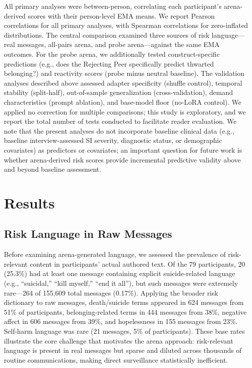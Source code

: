 \documentclass[review,12pt,authoryear]{elsarticle}
\begin{document}
All primary analyses were between-person, correlating each participant's arena-derived scores with their person-level EMA means. We report Pearson correlations for all primary analyses, with Spearman correlations for zero-inflated distributions. The central comparison examined three sources of risk language---real messages, all-pairs arena, and probe arena---against the same EMA outcomes. For the probe arena, we additionally tested construct-specific predictions (e.g., does the Rejecting Peer specifically predict thwarted belonging?) and reactivity scores (probe minus neutral baseline). The validation analyses described above assessed adapter specificity (shuffle control), temporal stability (split-half), out-of-sample generalization (cross-validation), demand characteristics (prompt ablation), and base-model floor (no-LoRA control). We applied no correction for multiple comparisons; this study is exploratory, and we report the total number of tests conducted to facilitate reader evaluation. We note that the present analyses do not incorporate baseline clinical data (e.g., baseline interview-assessed SI severity, diagnostic status, or demographic covariates) as predictors or covariates; an important question for future work is whether arena-derived risk scores provide incremental predictive validity above and beyond baseline assessment.


\section{Results}

\subsection{Risk Language in Raw Messages}

Before examining arena-generated language, we assessed the prevalence of risk-relevant content in participants' actual authored text. Of the 79 participants, 20 (25.3\%) had at least one message containing explicit suicide-related language (e.g., ``suicidal,'' ``kill myself,'' ``end it all''), but such messages were extremely rare---264 of 155,609 total messages (0.17\%). Applying the broader risk dictionary to raw messages, death/suicide terms appeared in 624 messages from 51\% of participants, belonging-related terms in 444 messages from 38\%, negative affect in 606 messages from 39\%, and hopelessness in 155 messages from 23\%. Self-harm language was rare (21 messages, 5\% of participants). These base rates illustrate the core challenge that motivates the arena approach: risk-relevant language is present in real messages but sparse and diluted across thousands of routine communications, making direct surveillance statistically inefficient.
\end{document}

